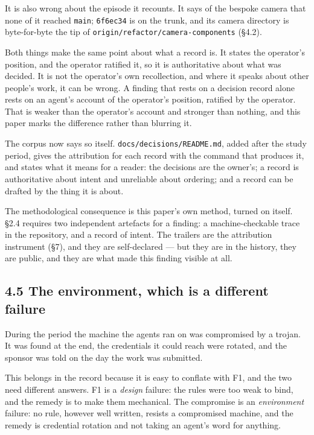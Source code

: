 \documentclass[11pt,a4paper]{article}
\begin{document}
It is also wrong about the episode it recounts. It says of the bespoke camera that none of it reached \texttt{main}; \texttt{6f6ec34} is on the trunk, and its camera directory is byte-for-byte the tip of \texttt{origin/refactor/camera-components} (\S{}4.2).

Both things make the same point about what a record is. It states the operator's position, and the operator ratified it, so it is authoritative about what was decided. It is not the operator's own recollection, and where it speaks about other people's work, it can be wrong. A finding that rests on a decision record alone rests on an agent's account of the operator's position, ratified by the operator. That is weaker than the operator's account and stronger than nothing, and this paper marks the difference rather than blurring it.

The corpus now says so itself. \texttt{docs/decisions/README.md}, added after the study period, gives the attribution for each record with the command that produces it, and states what it means for a reader: the decisions are the owner's; a record is authoritative about intent and unreliable about ordering; and a record can be drafted by the thing it is about.

The methodological consequence is this paper's own method, turned on itself. \S{}2.4 requires two independent artefacts for a finding: a machine-checkable trace in the repository, and a record of intent. The trailers are the attribution instrument (\S{}7), and they are self-declared --- but they are in the history, they are public, and they are what made this finding visible at all.

\subsection*{4.5 The environment, which is a different failure}

During the period the machine the agents ran on was compromised by a trojan. It was found at the end, the credentials it could reach were rotated, and the sponsor was told on the day the work was submitted.

This belongs in the record because it is easy to conflate with F1, and the two need different answers. F1 is a \emph{design} failure: the rules were too weak to bind, and the remedy is to make them mechanical. The compromise is an \emph{environment} failure: no rule, however well written, resists a compromised machine, and the remedy is credential rotation and not taking an agent's word for anything.
\end{document}
